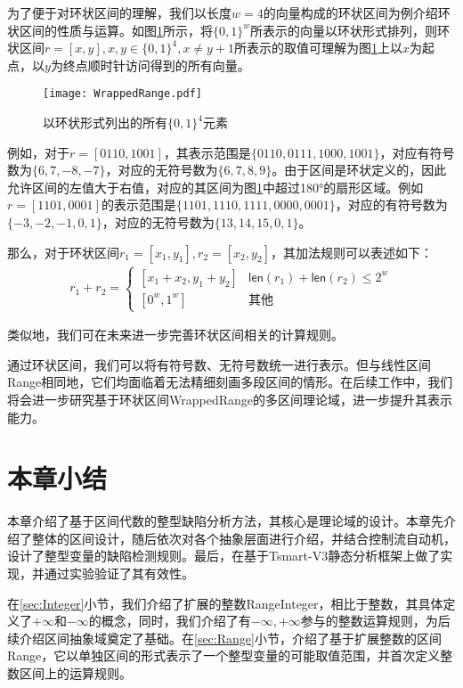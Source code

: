为了便于对环状区间的理解，我们以长度$ w = 4$的向量构成的环状区间为例介绍环状区间的性质与运算。如图\ref{fig:wrappedRange}所示，将$ \{0, 1\}^w $所表示的向量以环状形式排列，则环状区间$ r = [x, y], x, y\in \{0, 1\}^4, x \ne y + 1 $所表示的取值可理解为图\ref{fig:wrappedRange}上以$ x $为起点，以$ y $为终点顺时针访问得到的所有向量。

\begin{figure}[htb]
	\centering
	\texttt{[image: WrappedRange.pdf]}
	\caption{以环状形式列出的所有$ \{0, 1\}^4 $元素}
	\label{fig:wrappedRange}
\end{figure}

例如，对于$ r = [0110, 1001] $，其表示范围是$ \{0110, 0111, 1000, 1001\} $，对应有符号数为$ \{6, 7, -8, -7\} $，对应的无符号数为$ \{6, 7, 8, 9\} $。由于区间是环状定义的，因此允许区间的左值大于右值，对应的其区间为图\ref{fig:wrappedRange}中超过180°的扇形区域。例如$ r = [1101, 0001] $的表示范围是$ \{1101, 1110, 1111, 0000, 0001 \} $，对应的有符号数为$ \{-3, -2, -1, 0, 1\} $，对应的无符号数为$ \{13, 14, 15, 0, 1\} $。

那么，对于环状区间$ r_1 = [x_1, y_1], r_2 = [x_2, y_2] $，其加法规则可以表述如下：
\begin{align}
	r_1 + r_2 = \begin{cases}
	[x_1 + x_2, y_1 + y_2] & \mathsf{len}(r_1) + \mathsf{len}(r_2) \le 2^w\\
	[0^w, 1^w] & \text{其他}
	\end{cases}
\end{align}

类似地，我们可在未来进一步完善环状区间相关的计算规则。

通过环状区间，我们可以将有符号数、无符号数统一进行表示。但与线性区间Range相同地，它们均面临着无法精细刻画多段区间的情形。在后续工作中，我们将会进一步研究基于环状区间WrappedRange的多区间理论域，进一步提升其表示能力。

\section{本章小结}

本章介绍了基于区间代数的整型缺陷分析方法，其核心是理论域的设计。本章先介绍了整体的区间设计，随后依次对各个抽象层面进行介绍，并结合控制流自动机，设计了整型变量的缺陷检测规则。最后，在基于Tsmart-V3静态分析框架上做了实现，并通过实验验证了其有效性。

在\ref{sec:Integer}小节，我们介绍了扩展的整数RangeInteger，相比于整数，其具体定义了$ +\infty $和$ -\infty $的概念，同时，我们介绍了有$ -\infty, +\infty $参与的整数运算规则，为后续介绍区间抽象域奠定了基础。在\ref{sec:Range}小节，介绍了基于扩展整数的区间Range，它以单独区间的形式表示了一个整型变量的可能取值范围，并首次定义整数区间上的运算规则。


